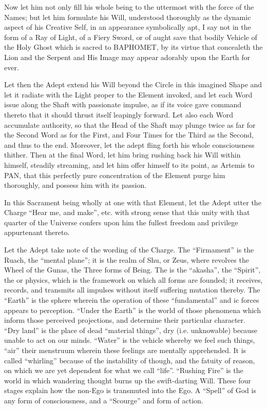 Now let him not only fill his whole being to the uttermost with the force of the Names; but let him formulate his Will, understood thoroughly as the dynamic aspect of his Creative Self, in an appearance symbolically apt, I say not in the form of a Ray of Light, of a Fiery Sword, or of aught save that bodily Vehicle of the Holy Ghost which is sacred to BAPHOMET, by its virtue that concealeth the Lion and the Serpent and His Image may appear adorably upon the Earth for ever.

Let then the Adept extend his Will beyond the Circle in this imagined Shape and let it radiate with the Light proper to the Element invoked, and let each Word issue along the Shaft with passionate impulse, as if its voice gave command thereto that it should thrust itself leapingly forward. Let also each Word accumulate authority, so that the Head of the Shaft may plunge twice as far for the Second Word as for the First, and Four Times for the Third as the Second, and thus to the end. Moreover, let the adept fling forth his whole consciousness thither. Then at the final Word, let him bring rushing back his Will within himself, steadily streaming, and let him offer himself to its point, as Artemis to PAN, that this perfectly pure concentration of the Element purge him thoroughly, and possess him with its passion.

In this Sacrament being wholly at one with that Element, let the Adept utter the Charge \enquote{Hear me, and make}, etc. with strong sense that this unity with that quarter of the Universe confers upon him the fullest freedom and privilege appurtenant thereto.

Let the Adept take note of the wording of the Charge. The \enquote{Firmament} is the Ruach, the \enquote{mental plane}; it is the realm of Shu, or Zeus, where revolves the Wheel of the Gunas, the Three forms of Being\footnotemark. The \AEthyr{} is the \enquote{akasha}, the \enquote{Spirit}, the \AEthyr{} or physics, which is the framework on which all forms are founded; it receives, records, and transmits all impulses without itself suffering mutation thereby. The \enquote{Earth} is the sphere wherein the operation of these \enquote{fundamental} and \aethyr{}ic forces appears to perception. \enquote{Under the Earth} is the world of those phenomena which inform those perceived projections, and determine their particular character. \enquote{Dry land} is the place of dead \enquote{material things}, dry (i.e. unknowable) because unable to act on our minds. \enquote{Water} is the vehicle whereby we feel such things, \enquote{air} their menstruum wherein these feelings are mentally apprehended. It is called \enquote{whirling} because of the instability of though, and the fatuity of reason, on which we are yet dependent for what we call \enquote{life}. \enquote{Rushing Fire} is the world in which wandering thought burns up the swift-darting Will. These four stages explain how the non-Ego is transmuted into the Ego. A \enquote{Spell} of God is any form of consciousness, and a \enquote{Scourge} and form of action.


